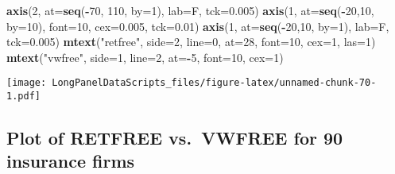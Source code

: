 \documentclass[]{book}
\newenvironment{Shaded}{\begin{snugshade}}{\end{snugshade}}
\newcommand{\DataTypeTok}[1]{\textcolor[rgb]{0.13,0.29,0.53}{#1}}
\newcommand{\DecValTok}[1]{\textcolor[rgb]{0.00,0.00,0.81}{#1}}
\newcommand{\FloatTok}[1]{\textcolor[rgb]{0.00,0.00,0.81}{#1}}
\newcommand{\KeywordTok}[1]{\textcolor[rgb]{0.13,0.29,0.53}{\textbf{#1}}}
\newcommand{\NormalTok}[1]{#1}
\newcommand{\OperatorTok}[1]{\textcolor[rgb]{0.81,0.36,0.00}{\textbf{#1}}}
\newcommand{\StringTok}[1]{\textcolor[rgb]{0.31,0.60,0.02}{#1}}
\begin{document}
\begin{Shaded}
\begin{Highlighting}[]
\KeywordTok{axis}\NormalTok{(}\DecValTok{2}\NormalTok{, }\DataTypeTok{at=}\KeywordTok{seq}\NormalTok{(}\OperatorTok{-}\DecValTok{70}\NormalTok{, }\DecValTok{110}\NormalTok{, }\DataTypeTok{by=}\DecValTok{1}\NormalTok{), }\DataTypeTok{lab=}\NormalTok{F, }\DataTypeTok{tck=}\FloatTok{0.005}\NormalTok{)}
\KeywordTok{axis}\NormalTok{(}\DecValTok{1}\NormalTok{, }\DataTypeTok{at=}\KeywordTok{seq}\NormalTok{(}\OperatorTok{-}\DecValTok{20}\NormalTok{,}\DecValTok{10}\NormalTok{, }\DataTypeTok{by=}\DecValTok{10}\NormalTok{), }\DataTypeTok{font=}\DecValTok{10}\NormalTok{, }\DataTypeTok{cex=}\FloatTok{0.005}\NormalTok{, }\DataTypeTok{tck=}\FloatTok{0.01}\NormalTok{)}
\KeywordTok{axis}\NormalTok{(}\DecValTok{1}\NormalTok{, }\DataTypeTok{at=}\KeywordTok{seq}\NormalTok{(}\OperatorTok{-}\DecValTok{20}\NormalTok{,}\DecValTok{10}\NormalTok{, }\DataTypeTok{by=}\DecValTok{1}\NormalTok{), }\DataTypeTok{lab=}\NormalTok{F, }\DataTypeTok{tck=}\FloatTok{0.005}\NormalTok{)}
\KeywordTok{mtext}\NormalTok{(}\StringTok{"retfree"}\NormalTok{, }\DataTypeTok{side=}\DecValTok{2}\NormalTok{, }\DataTypeTok{line=}\DecValTok{0}\NormalTok{, }\DataTypeTok{at=}\DecValTok{28}\NormalTok{, }\DataTypeTok{font=}\DecValTok{10}\NormalTok{, }\DataTypeTok{cex=}\DecValTok{1}\NormalTok{, }\DataTypeTok{las=}\DecValTok{1}\NormalTok{)}
\KeywordTok{mtext}\NormalTok{(}\StringTok{"vwfree"}\NormalTok{, }\DataTypeTok{side=}\DecValTok{1}\NormalTok{, }\DataTypeTok{line=}\DecValTok{2}\NormalTok{, }\DataTypeTok{at=}\OperatorTok{-}\DecValTok{5}\NormalTok{, }\DataTypeTok{font=}\DecValTok{10}\NormalTok{, }\DataTypeTok{cex=}\DecValTok{1}\NormalTok{)}
\end{Highlighting}
\end{Shaded}

\texttt{[image: LongPanelDataScripts\_files/figure-latex/unnamed-chunk-70-1.pdf]}

\hypertarget{plot-of-retfree-vs.-vwfree-for-90-insurance-firms}{%
\subsection{Plot of RETFREE vs.~VWFREE for 90 insurance firms}\label{plot-of-retfree-vs.-vwfree-for-90-insurance-firms}}
\end{document}
